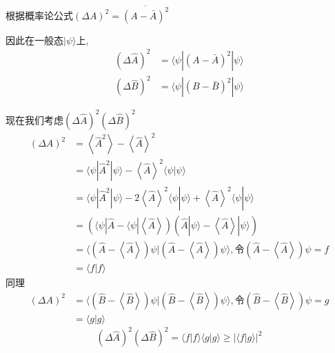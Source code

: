 \documentclass[lang=cn,10pt]{elegantbook}
\begin{document}
根据概率论公式\quad $(\varDelta A)^2=\overline{(A-\bar{A})^2}$

因此在一般态$|\psi\rangle$上,
\begin{equation*}
	\begin{split}
		\left( \varDelta \hat{A} \right) ^2&=\langle \psi |(A-\bar{A})^2|\psi \rangle 
		\\
		\left( \varDelta \hat{B} \right) ^2&=\langle \psi |(B-\bar{B})^2|\psi \rangle 
	\end{split}
\end{equation*}

现在我们考虑$\left( \varDelta \hat{A} \right) ^2\left( \varDelta \hat{B} \right) ^2$
\begin{equation*}
	\begin{split}
		\left( \varDelta A \right) ^2&=\left< \hat{A}^2 \right> -\left< \hat{A} \right> ^2
		\\
		&=\langle \psi |\hat{A}^2|\psi \rangle -\left< \hat{A} \right> ^2\langle \psi |\psi \rangle 
		\\
		&=\langle \psi |\hat{A}^2|\psi \rangle -2\left< \hat{A} \right> ^2\langle \psi |\psi \rangle +\left< \hat{A} \right> ^2\langle \psi |\psi \rangle 
		\\
		&=\left( \langle \psi |\hat{A}-\langle \psi |\left< \hat{A} \right> \right) \left( \hat{A}|\psi \rangle -\left< \hat{A} \right> |\psi \rangle \right) 
		\\
		&=\langle \left( \hat{A}-\left< \hat{A} \right> \right) \psi |\left( \hat{A}-\left< \hat{A} \right> \right) \psi \rangle ,\text{令}\left( \hat{A}-\left< \hat{A} \right> \right) \psi =f
		\\
		&=\langle f|f\rangle 
	\end{split}
\end{equation*}
同理
\begin{equation*}
	\begin{split}
		\left( \varDelta A \right) ^2&=\langle \left( \hat{B}-\left< \hat{B} \right> \right) \psi |\left( \hat{B}-\left< \hat{B} \right> \right) \psi \rangle ,\text{令}\left( \hat{B}-\left< \hat{B} \right> \right) \psi =g
		\\
		&=\langle g|g\rangle 
	\end{split}
\end{equation*}
\begin{equation*}
	\left( \varDelta \hat{A} \right) ^2\left( \varDelta \hat{B} \right) ^2=\langle f|f\rangle \langle g|g\rangle \ge |\langle f|g\rangle |^2
\end{equation*}
\end{document}
